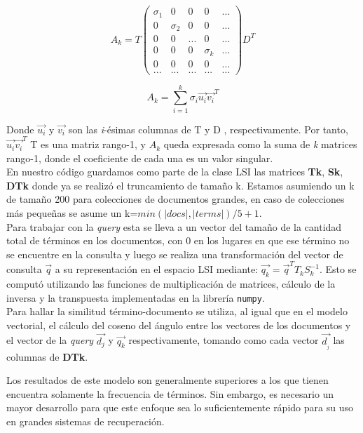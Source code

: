 \documentclass[spanish]{article}
\begin{document}
\begin{equation}
A_{k}= T
\begin{pmatrix}
\sigma_{1} & 0 & 0 & 0 & ...\\
0 & \sigma_{2} & 0 & 0 & ...\\
0 & 0 & ... & 0 & ...\\
0 & 0 & 0 & \sigma_{k} & ... \\
0 & 0 & 0 & 0 & ...\\
... & ... & ... & ... & ...
\end{pmatrix}
D^{T}
\end{equation}

$$A_{k}=\sum^{k}_{i=1}\sigma_{i}\vec{u_{i}}\vec{v_{i}}^{T}$$

Donde $\vec{u_{i}}$ y $\vec{v_{i}}$ son las \textit{i}-ésimas columnas de T y D , respectivamente. Por tanto, $\vec{u_{i}}\vec{v_{i}}^{T}$ T es una matriz rango-1, y $A_{k}$ queda expresada como la suma de \textit{k} matrices rango-1, donde el coeficiente de cada una es un valor singular.\\

En nuestro código guardamos como parte de la clase LSI las matrices  \textbf{Tk}, \textbf{Sk}, \textbf{DTk} donde ya se realizó el truncamiento de tamaño k. Estamos asumiendo un k de tamaño 200 para colecciones de documentos grandes, en caso de colecciones más pequeñas se asume un k=$min(|docs|,|terms|)/5+1$. \\

Para trabajar con la \emph{query} esta se lleva a un vector del tamaño de la cantidad total de términos en los documentos, con 0 en los lugares en que ese término no se encuentre en la consulta y luego se realiza una transformación del vector de consulta $\vec{q}$ a su representación en el espacio LSI mediante: $\vec{q_{k}}=\vec{q}^{T}T_{k}S_{k}^{-1}$. Esto se computó utilizando las funciones de multiplicación de matrices, cálculo de la inversa y la transpuesta implementadas en la librería \texttt{numpy}. \\

Para hallar la similitud término-documento se utiliza, al igual que en el modelo vectorial, el cálculo del coseno del ángulo entre los vectores de los documentos y el vector de la \emph{query} $\vec{d_{j}}$ y $\vec{q_{k}}$ respectivamente, tomando como cada vector $\vec{d_{_{j}}}$ las columnas de \textbf{DTk}.


Los resultados de este modelo son generalmente superiores a los que tienen encuentra solamente la frecuencia de términos. Sin embargo, es necesario un mayor desarrollo para que este enfoque sea lo suficientemente rápido para su uso en grandes sistemas de recuperación. 
\end{document}
